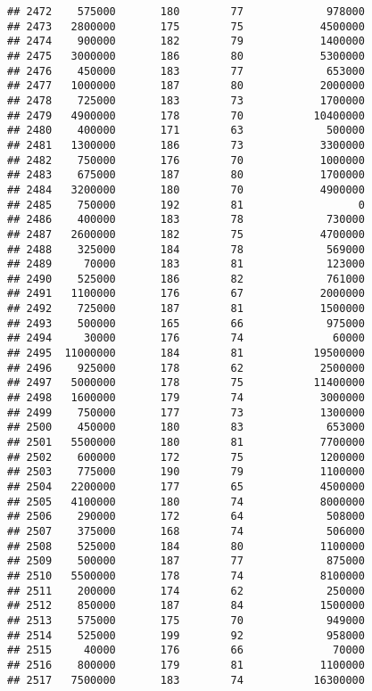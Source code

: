 \documentclass[
]{article}
\begin{document}
\begin{verbatim}
## 2472    575000       180        77             978000
## 2473   2800000       175        75            4500000
## 2474    900000       182        79            1400000
## 2475   3000000       186        80            5300000
## 2476    450000       183        77             653000
## 2477   1000000       187        80            2000000
## 2478    725000       183        73            1700000
## 2479   4900000       178        70           10400000
## 2480    400000       171        63             500000
## 2481   1300000       186        73            3300000
## 2482    750000       176        70            1000000
## 2483    675000       187        80            1700000
## 2484   3200000       180        70            4900000
## 2485    750000       192        81                  0
## 2486    400000       183        78             730000
## 2487   2600000       182        75            4700000
## 2488    325000       184        78             569000
## 2489     70000       183        81             123000
## 2490    525000       186        82             761000
## 2491   1100000       176        67            2000000
## 2492    725000       187        81            1500000
## 2493    500000       165        66             975000
## 2494     30000       176        74              60000
## 2495  11000000       184        81           19500000
## 2496    925000       178        62            2500000
## 2497   5000000       178        75           11400000
## 2498   1600000       179        74            3000000
## 2499    750000       177        73            1300000
## 2500    450000       180        83             653000
## 2501   5500000       180        81            7700000
## 2502    600000       172        75            1200000
## 2503    775000       190        79            1100000
## 2504   2200000       177        65            4500000
## 2505   4100000       180        74            8000000
## 2506    290000       172        64             508000
## 2507    375000       168        74             506000
## 2508    525000       184        80            1100000
## 2509    500000       187        77             875000
## 2510   5500000       178        74            8100000
## 2511    200000       174        62             250000
## 2512    850000       187        84            1500000
## 2513    575000       175        70             949000
## 2514    525000       199        92             958000
## 2515     40000       176        66              70000
## 2516    800000       179        81            1100000
## 2517   7500000       183        74           16300000

\end{verbatim}
\end{document}
